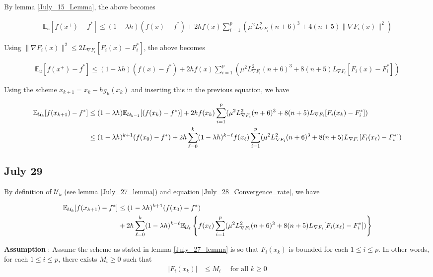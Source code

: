 \documentclass{article}
\begin{document}
By lemma \ref{July_15_Lemma}, the above becomes 

\begin{align}
\mathbb{E}_u[f(x^+) - f^*] \leq (1-\lambda h)(f(x)-f^*) + 2hf(x)\sum_{i=1}^p(\mu^2L_{\nabla F_i}^2(n+6)^3 + 4(n+5)\|\nabla F_i(x)\|^2)
\end{align}

Using $\|\nabla F_i(x)\|^2 \leq 2L_{\nabla F_i}[F_i(x) - F_i^*]$, the above becomes 

\begin{align}
\mathbb{E}_u[f(x^+) - f^*] \leq (1-\lambda h)(f(x)-f^*) + 2hf(x)\sum_{i=1}^p(\mu^2L_{\nabla F_i}^2(n+6)^3 + 8(n+5)L_{\nabla F_i}[F_i(x)-F_i^*])
\end{align}

Using the scheme $x_{k+1} = x_k - hg_{\mu}(x_k)$ and inserting this in the previous equation, we have 

\begin{align}
\mathbb{E}_{\mathcal{U}_k}[f(x_{k+1}) - f^*] & \leq (1-\lambda h)\mathbb{E}_{\mathcal{U}_{k-1}}[(f(x_k)-f^*)] + 2hf(x_k)\sum_{i=1}^p(\mu^2L_{\nabla F_i}^2(n+6)^3 + 8(n+5)L_{\nabla F_i}[F_i(x_k)-F_i^*]) \notag \\ & \leq  (1-\lambda h)^{k+1}(f(x_0)-f^*) + 2h\sum_{\ell = 0}^k(1-\lambda h)^{k-\ell}f(x_{\ell})\sum_{i=1}^p(\mu^2L_{\nabla F_i}^2(n+6)^3 + 8(n+5)L_{\nabla F_i}[F_i(x_{\ell})-F_i^*]) \label{July_28_Convergence_rate}
\end{align}

\subsection{July 29}

By definition of $\mathcal{U}_k$ (see lemma \ref{July_27_lemma}) and equation \eqref{July_28_Convergence_rate}, we have 

\begin{align}
\mathbb{E}_{\mathcal{U}_k}[f(x_{k+1}) - f^*] & \leq  (1-\lambda h)^{k+1}(f(x_0)-f^*) \notag \\ & + 2h\sum_{\ell = 0}^k(1-\lambda h)^{k-\ell}\mathbb{E}_{\mathcal{U}_{\ell}}\left\{f(x_{\ell})\sum_{i=1}^p(\mu^2L_{\nabla F_i}^2(n+6)^3 + 8(n+5)L_{\nabla F_i}[F_i(x_{\ell})-F_i^*])\right\}
\end{align}

\textbf{Assumption} \label{Assumption_July_29}: Assume the scheme as stated in lemma \ref{July_27_lemma} is so that $F_i(x_k)$ is bounded for each $1 \leq i \leq p$. In other words, for each $1 \leq i \leq p$, there exists $M_i \geq 0$ such that 
\begin{align}
|F_i(x_k)| & \leq M_i \quad \text{ for all } k \geq 0
\end{align}
\end{document}
